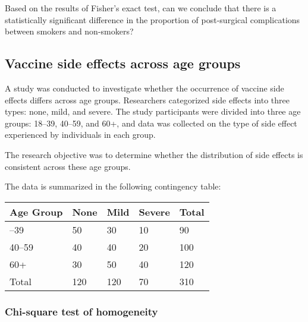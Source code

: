 \documentclass[
  letterpaper,
  DIV=11,
  numbers=noendperiod]{scrartcl}
\begin{document}
\begin{tcolorbox}[enhanced jigsaw, bottomrule=.15mm, coltitle=black, colbacktitle=quarto-callout-important-color!10!white, left=2mm, bottomtitle=1mm, breakable, colframe=quarto-callout-important-color-frame, toprule=.15mm, titlerule=0mm, title={Question 6}, opacitybacktitle=0.6, arc=.35mm, rightrule=.15mm, opacityback=0, leftrule=.75mm, toptitle=1mm, colback=white]

Based on the results of Fisher's exact test, can we conclude that there
is a statistically significant difference in the proportion of
post-surgical complications between smokers and non-smokers?

\end{tcolorbox}

\subsection{Vaccine side effects across age
groups}\label{vaccine-side-effects-across-age-groups}

A study was conducted to investigate whether the occurrence of vaccine
side effects differs across age groups. Researchers categorized side
effects into three types: none, mild, and severe. The study participants
were divided into three age groups: 18--39, 40--59, and 60+, and data
was collected on the type of side effect experienced by individuals in
each group.

The research objective was to determine whether the distribution of side
effects is consistent across these age groups.

The data is summarized in the following contingency table:

\begin{longtable}[]{@{}lllll@{}}
\toprule\noalign{}
Age Group & None & Mild & Severe & Total \\
\midrule\noalign{}
\endhead
\bottomrule\noalign{}
\endlastfoot
18--39 & 50 & 30 & 10 & 90 \\
40--59 & 40 & 40 & 20 & 100 \\
60+ & 30 & 50 & 40 & 120 \\
Total & 120 & 120 & 70 & 310 \\
\end{longtable}

\subsubsection{Chi-square test of
homogeneity}\label{chi-square-test-of-homogeneity}
\end{document}
